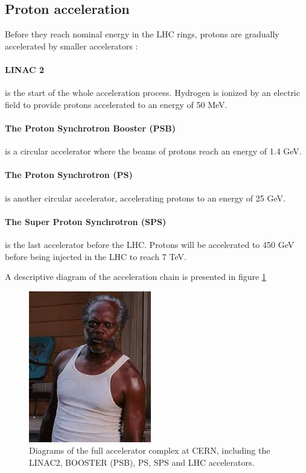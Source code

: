 \subsection{Proton acceleration}

Before they reach nominal energy in the LHC rings, protons are gradually accelerated by smaller accelerators :

\paragraph{LINAC 2} is the start of the whole acceleration process. Hydrogen is ionized by an electric field to provide protons accelerated to an energy of 50 MeV.

\paragraph{The Proton Synchrotron Booster (PSB)} is a circular accelerator where the beams of protons reach an energy of 1.4 GeV.

\paragraph{The Proton Synchrotron (PS)} is another circular accelerator, accelerating protons to an energy of 25 GeV.

\paragraph{The Super Proton Synchrotron (SPS)} is the last accelerator before the LHC. Protons will be accelerated to 450 GeV before being injected in the LHC to reach 7 TeV.

A descriptive diagram of the acceleration chain is presented in figure \ref{fig:LHC_acceleration}

\begin{figure}
    \centering
    \includegraphics{Images/placeholder.jpeg}
    \caption{Diagrams of the full accelerator complex at CERN, including the LINAC2, BOOSTER (PSB), PS, SPS and LHC accelerators.}
    \label{fig:LHC_acceleration}
\end{figure}

